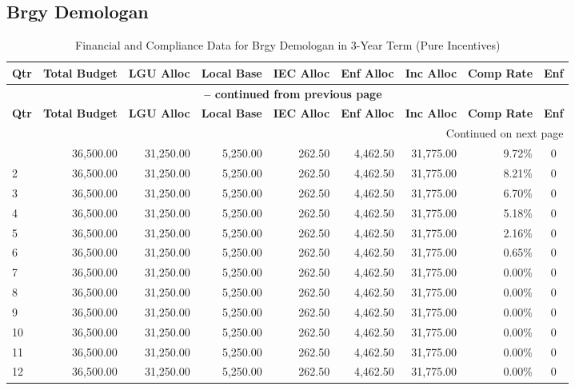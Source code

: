 \subsection{Brgy Demologan}
\begin{longtable}{lrrrrrrrc}
\caption{Financial and Compliance Data for Brgy Demologan in 3-Year Term (Pure Incentives)} \\
\toprule
\textbf{Qtr} & \textbf{Total Budget} & \textbf{LGU Alloc} & \textbf{Local Base} & \textbf{IEC Alloc} & \textbf{Enf Alloc} & \textbf{Inc Alloc} & \textbf{Comp Rate} & \textbf{Enf} \\
\midrule
\endfirsthead
\multicolumn{9}{c}{{\bfseries \tablename\ \thetable{} -- continued from previous page}} \\
\toprule
\textbf{Qtr} & \textbf{Total Budget} & \textbf{LGU Alloc} & \textbf{Local Base} & \textbf{IEC Alloc} & \textbf{Enf Alloc} & \textbf{Inc Alloc} & \textbf{Comp Rate} & \textbf{Enf} \\
\midrule
\endhead
\hline \multicolumn{9}{r}{{Continued on next page}} \\ \hline
\endfoot
\bottomrule
\endlastfoot
1 & 36,500.00 & 31,250.00 & 5,250.00 & 262.50 & 4,462.50 & 31,775.00 & 9.72\% & 0 \\
2 & 36,500.00 & 31,250.00 & 5,250.00 & 262.50 & 4,462.50 & 31,775.00 & 8.21\% & 0 \\
3 & 36,500.00 & 31,250.00 & 5,250.00 & 262.50 & 4,462.50 & 31,775.00 & 6.70\% & 0 \\
4 & 36,500.00 & 31,250.00 & 5,250.00 & 262.50 & 4,462.50 & 31,775.00 & 5.18\% & 0 \\
5 & 36,500.00 & 31,250.00 & 5,250.00 & 262.50 & 4,462.50 & 31,775.00 & 2.16\% & 0 \\
6 & 36,500.00 & 31,250.00 & 5,250.00 & 262.50 & 4,462.50 & 31,775.00 & 0.65\% & 0 \\
7 & 36,500.00 & 31,250.00 & 5,250.00 & 262.50 & 4,462.50 & 31,775.00 & 0.00\% & 0 \\
8 & 36,500.00 & 31,250.00 & 5,250.00 & 262.50 & 4,462.50 & 31,775.00 & 0.00\% & 0 \\
9 & 36,500.00 & 31,250.00 & 5,250.00 & 262.50 & 4,462.50 & 31,775.00 & 0.00\% & 0 \\
10 & 36,500.00 & 31,250.00 & 5,250.00 & 262.50 & 4,462.50 & 31,775.00 & 0.00\% & 0 \\
11 & 36,500.00 & 31,250.00 & 5,250.00 & 262.50 & 4,462.50 & 31,775.00 & 0.00\% & 0 \\
12 & 36,500.00 & 31,250.00 & 5,250.00 & 262.50 & 4,462.50 & 31,775.00 & 0.00\% & 0 \\
\end{longtable}
\newpage
